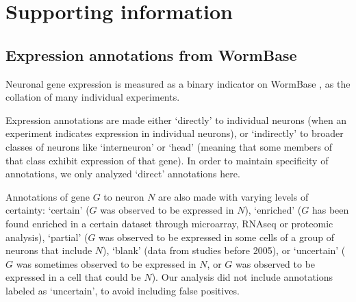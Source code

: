 \documentclass[10pt,letterpaper]{article}
\begin{document}






\newpage
\section*{Supporting information}
\setcounter{figure}{0} \renewcommand{\thefigure}{S\arabic{figure}}
\renewcommand{\thefigure}{S\arabic{figure}}

\subsection*{Expression annotations from WormBase}

Neuronal gene expression is measured as a binary indicator on WormBase \cite{Harris:2009kd}, as the collation of many individual experiments.

Expression annotations are made either `directly' to individual neurons (when an experiment indicates expression in individual neurons), or `indirectly' to broader classes of neurons like `interneuron' or `head' (meaning that some members of that class exhibit expression of that gene).
In order to maintain specificity of annotations, we only analyzed `direct' annotations here.

Annotations of gene $G$ to neuron $N$ are also made with varying levels of certainty:
`certain' ($G$ was observed to be expressed in $N$),
`enriched' ($G$ has been found enriched in a certain dataset through microarray, RNAseq or proteomic analysis),
`partial' ($G$ was observed to be expressed in some cells of a group of neurons that include $N$),
`blank' (data from studies before 2005),
or `uncertain' ($G$ was sometimes observed to be expressed in $N$, or $G$ was observed to be expressed in a cell that could be $N$).
Our analysis did not include annotations labeled as `uncertain', to avoid including false positives.
\end{document}
